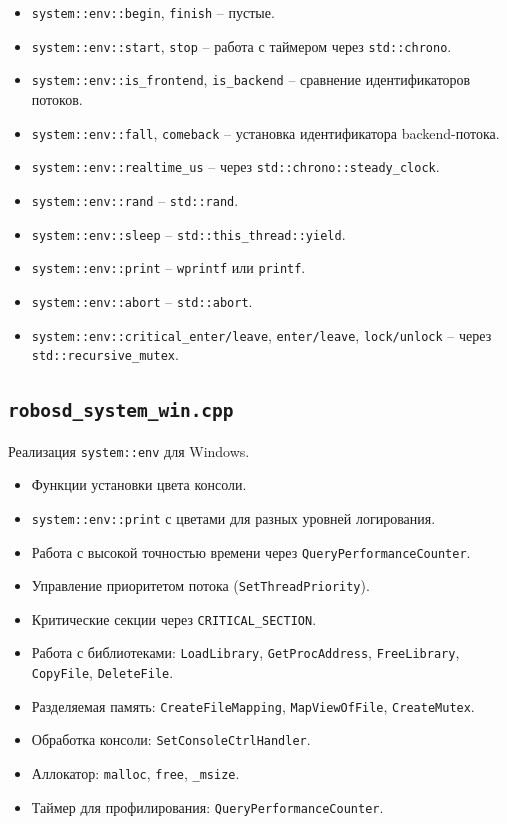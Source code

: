\documentclass[a4paper,12pt]{article}
\begin{document}
\begin{itemize}
    \item \texttt{system::env::begin}, \texttt{finish} -- пустые.
    \item \texttt{system::env::start}, \texttt{stop} -- работа с таймером через \texttt{std::chrono}.
    \item \texttt{system::env::is\_frontend}, \texttt{is\_backend} -- сравнение идентификаторов потоков.
    \item \texttt{system::env::fall}, \texttt{comeback} -- установка идентификатора backend-потока.
    \item \texttt{system::env::realtime\_us} -- через \texttt{std::chrono::steady\_clock}.
    \item \texttt{system::env::rand} -- \texttt{std::rand}.
    \item \texttt{system::env::sleep} -- \texttt{std::this\_thread::yield}.
    \item \texttt{system::env::print} -- \texttt{wprintf} или \texttt{printf}.
    \item \texttt{system::env::abort} -- \texttt{std::abort}.
    \item \texttt{system::env::critical\_enter/leave}, \texttt{enter/leave}, \texttt{lock/unlock} -- через \texttt{std::recursive\_mutex}.
\end{itemize}

\subsection{\texttt{robosd\_system\_win.cpp}}

Реализация \texttt{system::env} для Windows.

\begin{itemize}
    \item Функции установки цвета консоли.
    \item \texttt{system::env::print} с цветами для разных уровней логирования.
    \item Работа с высокой точностью времени через \texttt{QueryPerformanceCounter}.
    \item Управление приоритетом потока (\texttt{SetThreadPriority}).
    \item Критические секции через \texttt{CRITICAL\_SECTION}.
    \item Работа с библиотеками: \texttt{LoadLibrary}, \texttt{GetProcAddress}, \texttt{FreeLibrary}, \texttt{CopyFile}, \texttt{DeleteFile}.
    \item Разделяемая память: \texttt{CreateFileMapping}, \texttt{MapViewOfFile}, \texttt{CreateMutex}.
    \item Обработка консоли: \texttt{SetConsoleCtrlHandler}.
    \item Аллокатор: \texttt{malloc}, \texttt{free}, \texttt{\_msize}.
    \item Таймер для профилирования: \texttt{QueryPerformanceCounter}.
\end{itemize}
\end{document}
